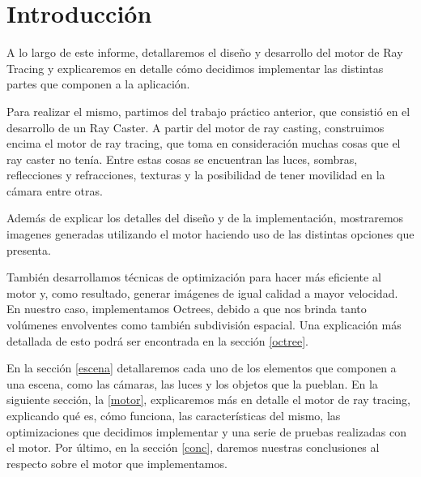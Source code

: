 
\section{Introducci\'on}
\label{intro}
A lo largo de este informe, detallaremos el dise\~no y desarrollo del motor de
Ray Tracing y explicaremos en detalle c\'omo decidimos implementar las distintas
partes que componen a la aplicaci\'on.

Para realizar el mismo, partimos del trabajo pr\'actico anterior, que
consisti\'o en
el desarrollo de un Ray Caster.  A partir del motor de ray casting,
construimos encima
el motor de ray tracing, que toma en consideraci\'on muchas cosas que el ray
caster no ten\'ia.
Entre estas cosas se encuentran las luces, sombras, reflecciones y refracciones,
texturas y la
posibilidad de tener movilidad en la c\'amara entre otras.

Adem\'as de explicar los detalles del dise\~no y de la implementaci\'on,
mostraremos imagenes generadas utilizando el motor haciendo uso de las distintas
opciones que presenta.

Tambi\'en desarrollamos t\'ecnicas de optimizaci\'on para hacer m\'as eficiente
al motor y, como resultado, generar im\'agenes de igual calidad a mayor
velocidad.  En nuestro caso, implementamos Octrees, debido a que nos brinda
tanto vol\'umenes envolventes como tambi\'en subdivisi\'on espacial.  Una
explicaci\'on m\'as detallada de esto podr\'a ser encontrada en la secci\'on
\ref{octree}.

En la secci\'on \ref{escena} detallaremos cada uno de los elementos que componen
a una escena, como las c\'amaras, las luces y los objetos que la pueblan.  En la
siguiente secci\'on, la \ref{motor}, explicaremos m\'as en detalle el motor de
ray tracing, explicando qu\'e es, c\'omo funciona, las caracter\'isticas del
mismo, las optimizaciones que decidimos implementar y una serie de pruebas
realizadas con el motor.
Por \'ultimo, en la secci\'on \ref{conc},
daremos nuestras conclusiones al respecto sobre el motor que implementamos.

\newpage

